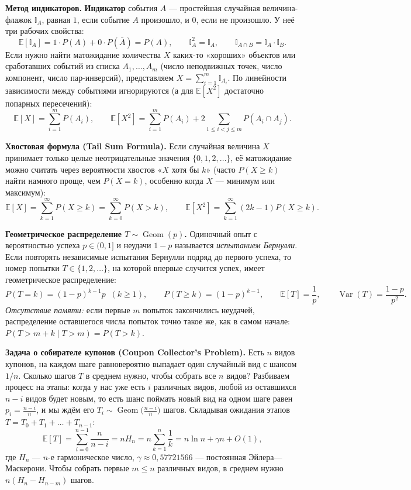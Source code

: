 \documentclass[10pt,a4paper]{article}
\renewcommand{\le}{\leqslant}
\renewcommand{\ge}{\geqslant}
\newcommand{\E}{\mathbb{E}}
\newcommand{\Var}{\operatorname{Var}}
\newcommand{\Ind}{\mathbb{I}}
\DeclareMathOperator{\Geom}{Geom}
\begin{document}
\textbf{Метод индикаторов.} \textbf{Индикатор} события $A$ — простейшая случайная величина-флажок $\Ind_A$, равная $1$, если событие $A$ произошло, и $0$, если не произошло. У неё три рабочих свойства:
\[
  \E[\Ind_A] = 1 \cdot P(A) + 0 \cdot P(\bar{A}) = P(A), \qquad \Ind_A^2 = \Ind_A, \qquad \Ind_{A \cap B} = \Ind_A \cdot \Ind_B.
\]
Если нужно найти матожидание количества $X$ каких-то «хороших» объектов или сработавших событий из списка $A_1, \dots, A_m$ (число неподвижных точек, число компонент, число пар-инверсий), представляем $X = \sum_{i=1}^m \Ind_{A_i}$. По линейности зависимости между событиями игнорируются (а для $\E[X^2]$ достаточно попарных пересечений):
\[
  \E[X] = \sum_{i=1}^{m} P(A_i), \qquad
  \E[X^2] = \sum_{i=1}^{m} P(A_i) + 2 \sum_{1 \le i < j \le m} P(A_i \cap A_j).
\]

\textbf{Хвостовая формула (Tail Sum Formula).} Если случайная величина $X$ принимает только целые неотрицательные значения $\{0, 1, 2, \dots\}$, её матожидание можно считать через вероятности хвостов «$X$ хотя бы $k$» (часто $P(X \ge k)$ найти намного проще, чем $P(X = k)$, особенно когда $X$ — минимум или максимум):
\[
  \E[X] = \sum_{k=1}^{\infty} P(X \ge k) = \sum_{k=0}^{\infty} P(X > k), \qquad
  \E[X^2] = \sum_{k=1}^{\infty} (2k - 1) P(X \ge k).
\]

\textbf{Геометрическое распределение $T \sim \Geom(p)$.} Одиночный опыт с вероятностью успеха $p \in (0, 1]$ и неудачи $1 - p$ называется \emph{испытанием Бернулли}. Если повторять независимые испытания Бернулли подряд до первого успеха, то номер попытки $T \in \{1, 2, \dots\}$, на которой впервые случится успех, имеет геометрическое распределение:
\[
  P(T = k) = (1 - p)^{k-1} p \;\;(k \ge 1), \qquad P(T \ge k) = (1 - p)^{k-1}, \qquad
  \E[T] = \frac{1}{p}, \qquad \Var(T) = \frac{1 - p}{p^2}.
\]
\emph{Отсутствие памяти:} если первые $m$ попыток закончились неудачей, распределение оставшегося числа попыток точно такое же, как в самом начале: $P(T > m + k \mid T > m) = P(T > k)$.

\textbf{Задача о собирателе купонов (Coupon Collector's Problem).} Есть $n$ видов купонов, на каждом шаге равновероятно выпадает один случайный вид с шансом $1/n$. Сколько шагов $T$ в среднем нужно, чтобы собрать все $n$ видов? Разбиваем процесс на этапы: когда у нас уже есть $i$ различных видов, любой из оставшихся $n - i$ видов будет новым, то есть шанс поймать новый вид на одном шаге равен $p_i = \frac{n - i}{n}$, и мы ждём его $T_i \sim \Geom\bigl(\frac{n - i}{n}\bigr)$ шагов. Складывая ожидания этапов $T = T_0 + T_1 + \dots + T_{n-1}$:
\[
  \E[T] = \sum_{i=0}^{n-1} \frac{n}{n - i} = n H_n = n \sum_{k=1}^{n} \frac{1}{k} = n \ln n + \gamma n + O(1),
\]
где $H_n$ — $n$-е гармоническое число, $\gamma \approx 0{,}57721566$ — постоянная Эйлера—Маскерони. Чтобы собрать первые $m \le n$ различных видов, в среднем нужно $n(H_n - H_{n-m})$ шагов.
\end{document}
